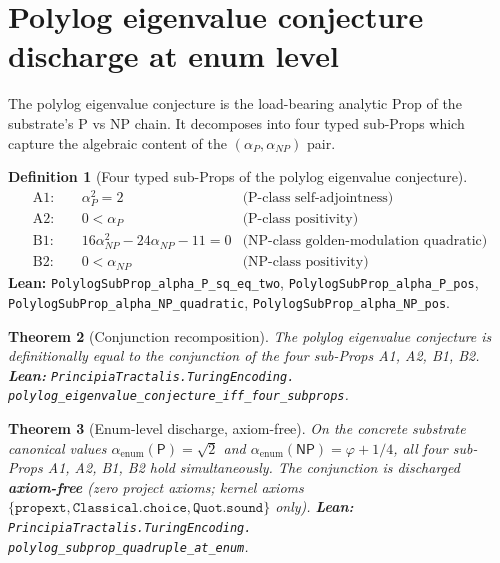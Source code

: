 \documentclass[11pt,a4paper]{article}
\theoremstyle{plain}
\newtheorem{theorem}{Theorem}[section]
\theoremstyle{definition}
\newtheorem{definition}[theorem]{Definition}
\begin{document}
\section{Polylog eigenvalue conjecture discharge at enum level}
\label{sec:polylog}

The polylog eigenvalue conjecture is the load-bearing analytic
Prop of the substrate's P vs NP chain. It decomposes into four
typed sub-Props which capture the algebraic content of the
$(\alpha_{P}, \alpha_{NP})$ pair.

\begin{definition}[Four typed sub-Props of the polylog eigenvalue conjecture]
\label{def:subprops}
\begin{align*}
\mathrm{A1:}\quad & \alpha_{P}^{2} = 2 &
\text{(P-class self-adjointness)} \\
\mathrm{A2:}\quad & 0 < \alpha_{P} &
\text{(P-class positivity)} \\
\mathrm{B1:}\quad & 16 \alpha_{NP}^{2} - 24 \alpha_{NP} - 11 = 0 &
\text{(NP-class golden-modulation quadratic)} \\
\mathrm{B2:}\quad & 0 < \alpha_{NP} &
\text{(NP-class positivity)}
\end{align*}
\textbf{Lean:}
\texttt{PolylogSubProp\_alpha\_P\_sq\_eq\_two},
\texttt{PolylogSubProp\_alpha\_P\_pos},
\texttt{PolylogSubProp\_alpha\_NP\_quadratic},
\texttt{PolylogSubProp\_alpha\_NP\_pos}.
\end{definition}

\begin{theorem}[Conjunction recomposition]
\label{thm:recomposition}
The polylog eigenvalue conjecture is definitionally equal to the
conjunction of the four sub-Props A1, A2, B1, B2.
\textbf{Lean:}
\texttt{PrincipiaTractalis.TuringEncoding.\\
polylog\_eigenvalue\_conjecture\_iff\_four\_subprops}.
\end{theorem}

\begin{theorem}[Enum-level discharge, axiom-free]
\label{thm:enum-discharge}
On the concrete substrate canonical values
$\alpha_{\mathrm{enum}}(\mathsf{P}) = \sqrt{2}$ and
$\alpha_{\mathrm{enum}}(\mathsf{NP}) = \varphi + 1/4$, all four
sub-Props A1, A2, B1, B2 hold simultaneously. The conjunction is
discharged \textbf{axiom-free} (zero project axioms; kernel axioms
$\{\texttt{propext}, \texttt{Classical.choice}, \texttt{Quot.sound}\}$
only).
\textbf{Lean:}
\texttt{PrincipiaTractalis.TuringEncoding.\\
polylog\_subprop\_quadruple\_at\_enum}.
\end{theorem}
\end{document}
